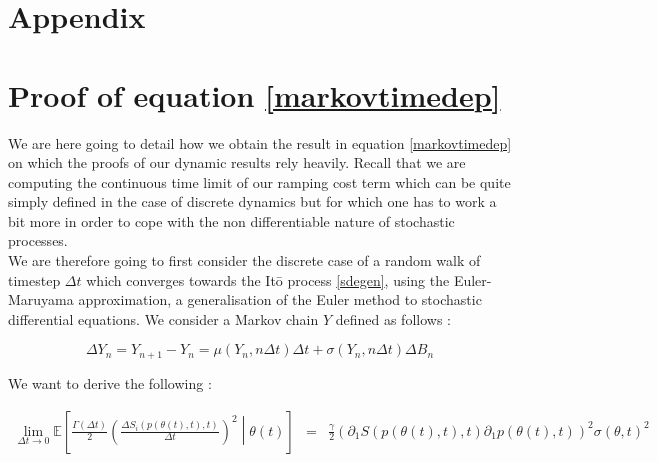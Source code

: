 %
%
\newpage
\begin{subappendices}
\section*{Appendix}

\section{Proof of equation \ref{markovtimedep}}\label{stochasticdyn_proof}
We are here going to detail how we obtain the result in equation \ref{markovtimedep} on which the proofs of our dynamic results rely heavily. Recall that we are computing the continuous time limit of our ramping cost term which can be quite simply defined in the case of discrete dynamics but for which one has to work a bit more in order to cope with the non differentiable nature of stochastic processes. \\

We are therefore going to first consider the discrete case of a random walk of timestep $\Delta t$ which converges towards the It\={o} process \ref{sdegen}, using the Euler-Maruyama approximation, a generalisation of the Euler method to stochastic differential equations. We consider a Markov chain $Y$ defined as follows : 

\begin{equation}
\Delta Y_n=Y_{n+1}-Y_n= \mu(Y_n,n \Delta t)\Delta t+\sigma (Y_n,n \Delta t)\Delta B_n
\end{equation}


We want to derive the following : 
\begin{footnotesize}
\begin{eqnarray}
\lim_{\Delta t \to 0}\mathbb{E}\left[\frac{\Gamma(\Delta t)}{2}\left(\frac{\Delta S_i(p(\theta(t),t),t)}{\Delta t}\right)^2\middle \vert \theta(t)  \right] &=& \frac{\gamma}{2} (\partial_1S(p(\theta(t),t),t)\partial_1p(\theta(t),t))^2 \sigma(\theta,t)^2
\end{eqnarray}
\end{footnotesize}


\end{subappendices}
